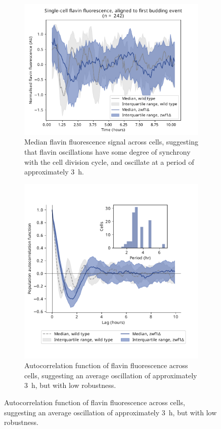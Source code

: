 \begin{figure}
  \centering
  \begin{subfigure}[t]{0.45\textwidth}
   \centering
   \includegraphics[width=\textwidth]{zwf1egf_409_6.pdf}
   \caption{
     Median flavin fluorescence signal across cells,%
     suggesting that flavin oscillations have some degree of synchrony with the cell division cycle, and oscillate at a period of approximately \SI{3}{\hour}.
   }
   \label{fig:biology-zwf1-median}
  \end{subfigure}%
  \begin{subfigure}[t]{0.45\textwidth}
   \centering
   \includegraphics[width=\textwidth]{zwf1egf_409_12.pdf}
   \caption{
    Autocorrelation function of flavin fluorescence across cells, suggesting an average oscillation of approximately \SI{3}{\hour}, but with low robustness.
   }
   \label{fig:biology-zwf1-median}
  \end{subfigure}


\end{figure}

